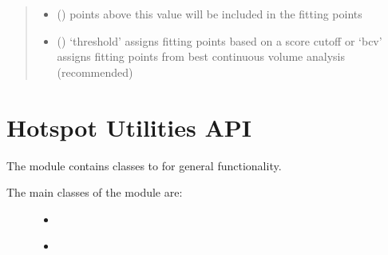 \documentclass[letterpaper,10pt,english]{sphinxmanual}
\begin{document}
\begin{fulllineitems}
\begin{fulllineitems}
\begin{quote}
\begin{description}
\begin{itemize}
\item {} 
 () \textendash{} points above this value will be included in the fitting points

\item {} 
 () \textendash{} ‘threshold’\sphinxhyphen{} assigns fitting points based on a score cutoff or ‘bcv’\sphinxhyphen{} assigns fitting points from best continuous volume analysis (recommended)

\end{itemize}

\end{description}\end{quote}

\end{fulllineitems}


\end{fulllineitems}



\chapter{Hotspot Utilities API}
\label{\detokenize{hs_utilities_api:module-hotspots.hs_utilities}}\label{\detokenize{hs_utilities_api:hotspot-utilities-api}}\label{\detokenize{hs_utilities_api::doc}}
The  module contains classes to for
general functionality.
\begin{description}
\item[{The main classes of the  module are:}] \leavevmode\begin{itemize}
\item {} 
{\hyperref[\detokenize{hs_utilities_api:hotspots.hs_utilities.Helper}]{}}

\item {} 
{\hyperref[\detokenize{hs_utilities_api:hotspots.hs_utilities.Figures}]{}}

\end{itemize}

\end{description}
\end{document}
